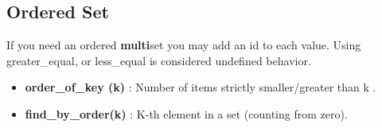 \subsection{Ordered Set}
 
If you need an ordered \textbf{multi}set you may add an id to each value. Using greater\_equal, or less\_equal is considered undefined behavior.

\begin{itemize}
  \item  \textbf{order\_of\_key (k)} : Number of items strictly smaller/greater than k .
  \item  \textbf{find\_by\_order(k)} : K-th element in a set (counting from zero). 
\end{itemize}

